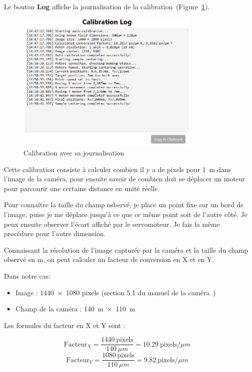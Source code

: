 Le bouton \textcolor[RGB]{102,125,138}{\textbf{Log}} affiche la journalisation de la calibration~(Figure~\ref{Calibration_Center_logs}).
\begin{figure}[H]
    \centering
    \includegraphics[width=0.8\textwidth]{assets/figures/Application_ServoVision/Calibration_Center_logs.jpeg}
    \caption{Calibration avec sa journalisation}
    \label{Calibration_Center_logs}
\end{figure}
Cette calibration consiste à calculer combien il y a de pixels pour 1~\textmu m dans l'image de la caméra, pour ensuite savoir de combien doit se déplacer un moteur pour parcourir une certaine distance en unité réelle.

Pour connaître la taille du champ osbervé, je place un point fixe sur un bord de l'image, puise je me déplace jusqu'à ce que ce même point soit de l'autre côté. Je peux ensuite observer l'écart affiché par le servomoteur. Je fais la même procédure pour l'autre dimension.

Connaissant la résolution de l'image capturée par la caméra et la taille du champ observé en \textmu m, on peut calculer un facteur de conversion en X et en Y.

Dans notre cas:
\begin{itemize}
    \item Image : 1440~$\times$~1080 pixels (section 5.1 du manuel de la caméra~\cite{cameraCS165CU/M})
    \item Champ de la caméra : 140~\textmu m~$\times$~110~\textmu m
\end{itemize}

Les formules du facteur en X et Y sont :

\[
    \text{Facteur}_X = \frac{1440\ \text{pixels}}{140\ \mu m} = 10.29\ \text{pixels}/\mu m
\]
\[
    \text{Facteur}_Y = \frac{1080\ \text{pixels}}{110\ \mu m} = 9.82\ \text{pixels}/\mu m
\]

